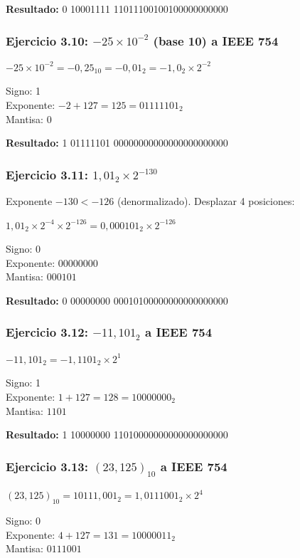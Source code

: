\documentclass[12pt,a4paper]{article}
\begin{document}
\textbf{Resultado:} 0 10001111 11011100100100000000000

\subsubsection{Ejercicio 3.10: $-25 \times 10^{-2}$ (base 10) a IEEE 754}

$-25 \times 10^{-2} = -0,25_{10} = -0,01_2 = -1,0_2 \times 2^{-2}$

Signo: 1\\
Exponente: $-2 + 127 = 125 = 01111101_2$\\
Mantisa: 0

\textbf{Resultado:} 1 01111101 00000000000000000000000

\subsubsection{Ejercicio 3.11: $1,01_2 \times 2^{-130}$}

Exponente $-130 < -126$ (denormalizado). Desplazar 4 posiciones:

$1,01_2 \times 2^{-4} \times 2^{-126} = 0,000101_2 \times 2^{-126}$

Signo: 0\\
Exponente: 00000000\\
Mantisa: $000101$

\textbf{Resultado:} 0 00000000 00010100000000000000000

\subsubsection{Ejercicio 3.12: $-11,101_2$ a IEEE 754}

$-11,101_2 = -1,1101_2 \times 2^1$

Signo: 1\\
Exponente: $1 + 127 = 128 = 10000000_2$\\
Mantisa: $1101$

\textbf{Resultado:} 1 10000000 11010000000000000000000

\subsubsection{Ejercicio 3.13: $(23,125)_{10}$ a IEEE 754}

$(23,125)_{10} = 10111,001_2 = 1,0111001_2 \times 2^4$

Signo: 0\\
Exponente: $4 + 127 = 131 = 10000011_2$\\
Mantisa: $0111001$
\end{document}

